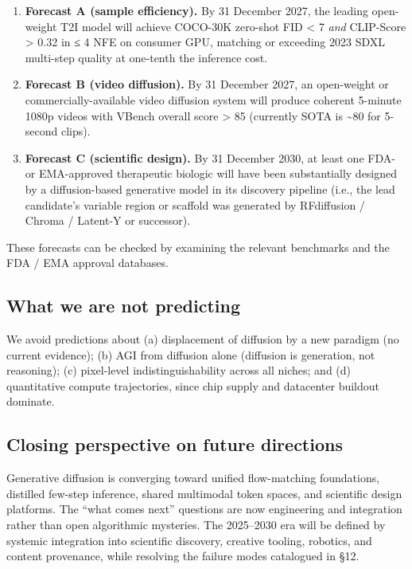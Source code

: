\documentclass{article}
\begin{document}
\begin{enumerate}
\def\labelenumi{\arabic{enumi}.}

\item
  \textbf{Forecast A (sample efficiency).} By 31 December 2027, the leading open-weight T2I model will achieve COCO-30K zero-shot FID \textless{} 7 \emph{and} CLIP-Score \textgreater{} 0.32 in ≤ 4 NFE on consumer GPU, matching or exceeding 2023 SDXL multi-step quality at one-tenth the inference cost.
\item
  \textbf{Forecast B (video diffusion).} By 31 December 2027, an open-weight or commercially-available video diffusion system will produce coherent 5-minute 1080p videos with VBench overall score \textgreater{} 85 (currently SOTA is \textasciitilde80 for 5-second clips).
\item
  \textbf{Forecast C (scientific design).} By 31 December 2030, at least one FDA- or EMA-approved therapeutic biologic will have been substantially designed by a diffusion-based generative model in its discovery pipeline (i.e., the lead candidate's variable region or scaffold was generated by RFdiffusion / Chroma / Latent-Y or successor).
\end{enumerate}

These forecasts can be checked by examining the relevant benchmarks and the FDA / EMA approval databases.

\subsection{What we are not predicting}\label{what-we-are-not-predicting}

We avoid predictions about (a) displacement of diffusion by a new paradigm (no current evidence); (b) AGI from diffusion alone (diffusion is generation, not reasoning); (c) pixel-level indistinguishability across all niches; and (d) quantitative compute trajectories, since chip supply and datacenter buildout dominate.

\subsection{Closing perspective on future directions}\label{closing-perspective-on-future-directions}

Generative diffusion is converging toward unified flow-matching foundations, distilled few-step inference, shared multimodal token spaces, and scientific design platforms. The ``what comes next'' questions are now engineering and integration rather than open algorithmic mysteries. The 2025--2030 era will be defined by systemic integration into scientific discovery, creative tooling, robotics, and content provenance, while resolving the failure modes catalogued in §12.
\end{document}
